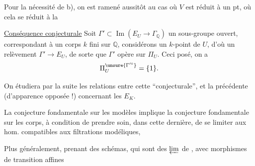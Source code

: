 Pour la nécessité de b), on est ramené aussitôt au cas où $V$ est réduit à un pt, où cela se réduit à la 

\uline{Conséquence conjecturale} Soit $\Gamma'\subset\operatorname{Im}(E_U\longrightarrow\Gamma_{\mathbb{Q}})$ un sous-groupe ouvert, correspondant à un corps $k$ fini sur $\mathbb{Q}$, considérons un $k$-point de $U$, d'où un relèvement $\Gamma'\longrightarrow E_U$, de sorte que $\Gamma'$ opère sur $\Pi_U$. Ceci posé, on a
\[
\Pi_U^{\unsure{\Gamma'^\circ}}=\{1\}.
\]

On étudiera par la suite les relations entre cette  ``conjecturale'', et la précédente (d'apparence opposée !) concernant les $E_K$.

La conjecture fondamentale sur les modèles implique la conjecture fondamentale sur les corps, à condition de prendre soin, dans cette dernière, de se limiter aux hom. compatibles aux filtrations modéliques,

Plus généralement, prenant  des schémas,  qui sont des $\varprojlim$ de   , avec morphismes de transition  affines
